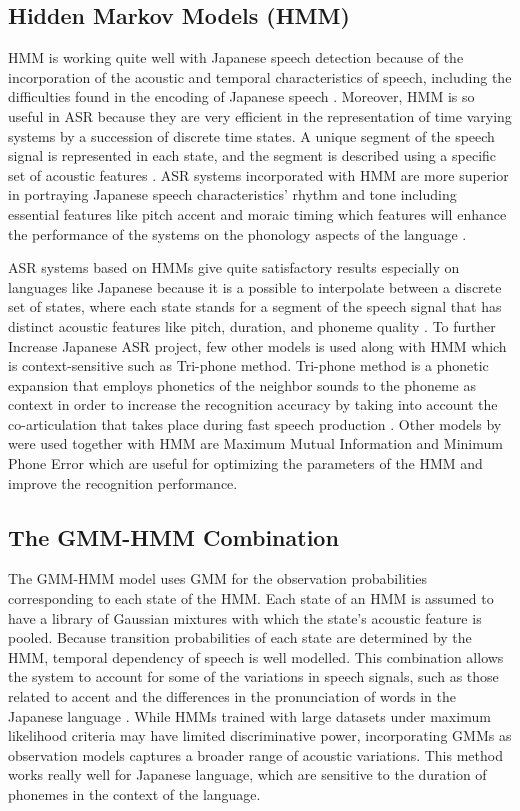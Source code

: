 \subsection{Hidden Markov Models (HMM)}
HMM is working quite well with Japanese speech detection because of the incorporation of the acoustic and temporal characteristics of speech, including the difficulties found in the encoding of Japanese speech \parencite{Tokuda1999Application}. Moreover, HMM is so useful in ASR because they are very efficient in the representation of time varying systems by a succession of discrete time states. A unique segment of the speech signal is represented in each state, and the segment is described using a specific set of acoustic features \parencite{juang1991hidden}. ASR systems incorporated with HMM are more superior in portraying Japanese speech characteristics’ rhythm and tone including essential features like pitch accent and moraic timing which features will enhance the performance of the systems on the phonology aspects of the language \parencite{Tokuda2000HMM}.

ASR systems based on HMMs give quite satisfactory results especially on languages like Japanese because it is a possible to interpolate between a discrete set of states, where each state stands for a segment of the speech signal that has distinct acoustic features like pitch, duration, and phoneme quality \parencite{juang1991hidden}. To further Increase Japanese ASR project, few other models is used along with HMM which is context-sensitive such as Tri-phone method. Tri-phone method is a phonetic expansion that employs phonetics of the neighbor sounds to the phoneme as context in order to increase the recognition accuracy by taking into account the co-articulation that takes place during fast speech production \parencite{Tokuda2000HMM}. Other models by \textcite{gales2008application} were used together with HMM are Maximum Mutual Information and Minimum Phone Error which are useful for optimizing the parameters of the HMM and improve the recognition performance. 


\subsection{The GMM-HMM Combination}
The GMM-HMM model uses GMM for the observation probabilities corresponding to each state of the HMM. Each state of an HMM is assumed to have a library of Gaussian mixtures with which the state’s acoustic feature is pooled. Because transition probabilities of each state are determined by the HMM, temporal dependency of speech is well modelled. This combination allows the system to account for some of the variations in speech signals, such as those related to accent and the differences in the pronunciation of words in the Japanese language \parencite{taheri2006fuzzy}. While HMMs trained with large datasets under maximum likelihood criteria may have limited discriminative power, incorporating GMMs as observation models captures a broader range of acoustic variations. This method works really well for Japanese language, which are sensitive to the duration of phonemes in the context of the language.


